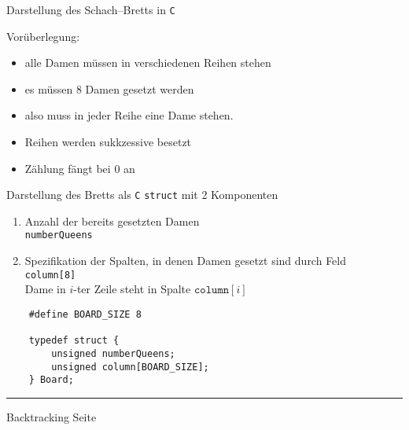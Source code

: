 
\begin{slide}{}
\normalsize

\begin{center}
Darstellung des Schach--Bretts in \texttt{C}
\end{center}
\vspace*{0.5cm}

\footnotesize
Vor\"uberlegung:
\begin{itemize}
\item  alle Damen m\"ussen in verschiedenen Reihen stehen
\item  es m\"ussen 8 Damen gesetzt werden 
\item  also muss in jeder Reihe eine Dame stehen.
\item  Reihen werden sukkzessive besetzt
\item  Z\"ahlung f\"angt bei 0 an
\end{itemize}

Darstellung des Bretts als \texttt{C} \texttt{struct} mit 2 Komponenten
\begin{enumerate}
\item Anzahl der bereits gesetzten Damen \\[0.3cm]
      \hspace*{1.3cm} \texttt{numberQueens}
\item Spezifikation der Spalten, in denen Damen gesetzt sind durch
      Feld \\[0.3cm]
      \hspace*{1.3cm} \texttt{column[8]} \\[0.3cm]
      Dame in $i$-ter Zeile steht in Spalte $\mathtt{column}[i]$
\end{enumerate}

\begin{verbatim}
    #define BOARD_SIZE 8

    typedef struct {
        unsigned numberQueens;  
        unsigned column[BOARD_SIZE];
    } Board;
\end{verbatim}

\vspace*{\fill}
\tiny \addtocounter{mypage}{1}
\rule{17cm}{1mm}
Backtracking  \hspace*{\fill} Seite 
\end{slide}


